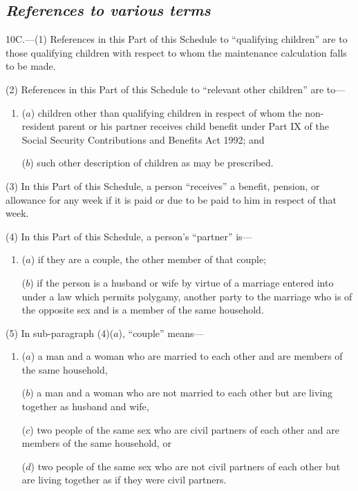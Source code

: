\documentclass[12pt,a4paper]{article}
\begin{document}

\subsection*{\itshape References to various terms}

10C.---(1) References in this Part of this Schedule to “qualifying children” are to those qualifying children with respect to whom the maintenance calculation falls to be made.

(2) References in this Part of this Schedule to “relevant other children” are to—
\begin{enumerate}\item[]
($a$) children other than qualifying children in respect of whom the non-resident parent or his partner receives child benefit under Part IX of the Social Security Contributions and Benefits Act 1992; and

($b$) such other description of children as may be prescribed.
\end{enumerate}

(3) In this Part of this Schedule, a person “receives” a benefit, pension, or allowance for any week if it is paid or due to be paid to him in respect of that week.

(4) In this Part of this Schedule, a person’s “partner” is—
\begin{enumerate}\item[]
($a$) if they are a couple, the other member of that couple;

($b$) if the person is a husband or wife by virtue of a marriage entered into under a law which permits polygamy, another party to the marriage who is of the opposite sex and is a member of the same household.
\end{enumerate}

%

(5) In sub-paragraph (4)($a$), “couple” means—
\begin{enumerate}\item[]
($a$) a man and a woman who are married to each other and are members of the same household,

($b$) a man and a woman who are not married to each other but are living together as husband and wife,

($c$) two people of the same sex who are civil partners of each other and are members of the same household, or

($d$) two people of the same sex who are not civil partners of each other but are living together as if they were civil partners.
\end{enumerate}
\end{document}
